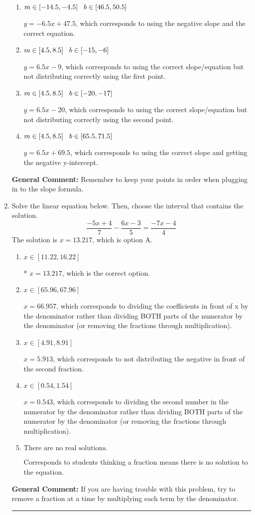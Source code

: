 \documentclass{extbook}[14pt]
\newcommand{\litem}[1]{\item #1

\rule{\textwidth}{0.4pt}}
\begin{document}
\begin{enumerate}
{\begin{enumerate}[label=\Alph*.]
* $y = 6.5x -69.5$, which is the correct option.
\item \( m \in [-14.5, -4.5] \hspace*{3mm} b \in [46.5, 50.5] \)

 $y = -6.5x + 47.5$, which corresponds to using the negative slope and the correct equation.
\item \( m \in [4.5, 8.5] \hspace*{3mm} b \in [-15, -6] \)

 $y = 6.5x -9$, which corresponds to using the correct slope/equation but not distributing correctly using the first point.
\item \( m \in [4.5, 8.5] \hspace*{3mm} b \in [-20, -17] \)

 $y = 6.5x -20$, which corresponds to using the correct slope/equation but not distributing correctly using the second point.
\item \( m \in [4.5, 8.5] \hspace*{3mm} b \in [65.5, 71.5] \)

 $y = 6.5x + 69.5$, which corresponds to using the correct slope and getting the negative y-intercept.
\end{enumerate}

\textbf{General Comment:} Remember to keep your points in order when plugging in to the slope formula.
}
\litem{
Solve the linear equation below. Then, choose the interval that contains the solution.
\[ \frac{-5x + 4}{7} - \frac{6x -3}{5} = \frac{-7x -4}{4} \]The solution is \( x = 13.217 \), which is option A.\begin{enumerate}[label=\Alph*.]
\item \( x \in [11.22, 16.22] \)

* $x = 13.217$, which is the correct option.
\item \( x \in [65.96, 67.96] \)

 $x = 66.957$, which corresponds to dividing the coefficients in front of x by the denominator rather than dividing BOTH parts of the numerator by the denominator (or removing the fractions through multiplication).
\item \( x \in [4.91, 8.91] \)

 $x = 5.913$, which corresponds to not distributing the negative in front of the second fraction.
\item \( x \in [0.54, 1.54] \)

 $x = 0.543$, which corresponds to dividing the second number in the numerator by the denominator rather than dividing BOTH parts of the numerator by the denominator (or removing the fractions through multiplication).
\item \( \text{There are no real solutions.} \)

Corresponds to students thinking a fraction means there is no solution to the equation.
\end{enumerate}

\textbf{General Comment:} If you are having trouble with this problem, try to remove a fraction at a time by multiplying each term by the denominator.
}
\end{enumerate}
\end{document}
